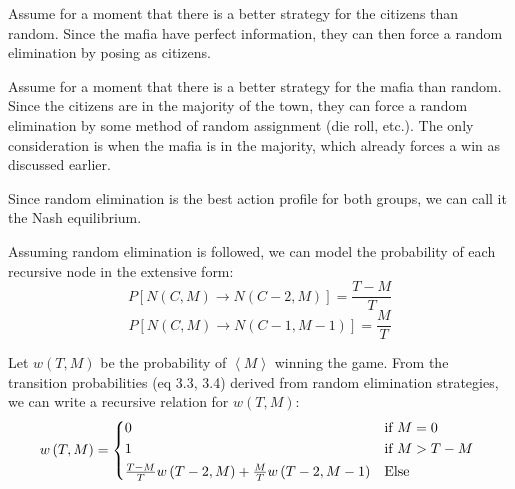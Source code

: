 \documentclass[12pt]{article}
\begin{document}
Assume for a moment that there is a better strategy for the citizens than random. Since the mafia have perfect information, they can then force a random elimination by posing as citizens.

Assume for a moment that there is a better strategy for the mafia than random. Since the citizens are in the majority of the town, they can force a random elimination by some method of random assignment (die roll, etc.). The only consideration is when the mafia is in the majority, which already forces a win as discussed earlier.

Since random elimination is the best action profile for both groups, we can call it the Nash equilibrium.

Assuming random elimination is followed, we can model the probability of each recursive node in the extensive form:
\begin{equation}
P\left[N\left(C,M\right) \rightarrow N\left(C-2,M\right)\right]=\frac{T-M}{T}
\end{equation}
\begin{equation}
P\left[N\left(C,M\right) \rightarrow N\left(C-1,M-1\right)\right]=\frac{M}{T}
\end{equation}

Let $w\left(T,M\right)$ be the probability of $\left<M\right>$ winning the game. From the transition probabilities (eq 3.3, 3.4) derived from random elimination strategies, we can write a recursive relation for $w\left(T,M\right)$:
\begin{equation}
	w\left(T,M\right) =
	\begin{cases*}
		0 & if $M=0$ \\
		1 & if $M>T-M$ \\
		\frac{T-M}{T}w\left(T-2,M\right) + \frac{M}{T}w\left(T-2,M-1\right) & Else
	\end{cases*}
\end{equation}
\end{document}
